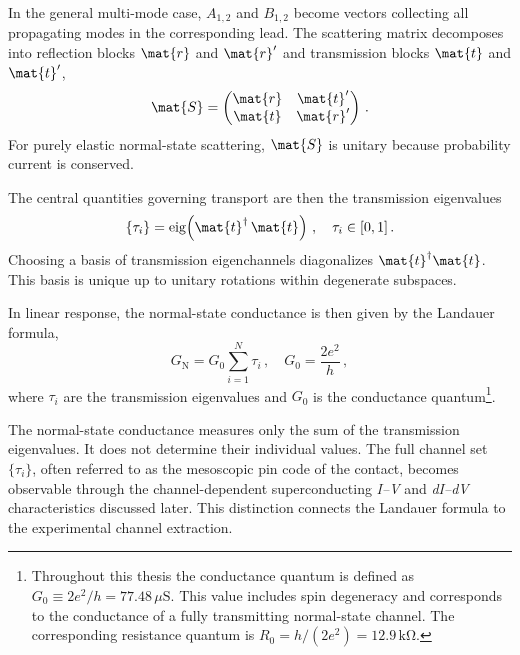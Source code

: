             In the general multi-mode case, $A_{1,2}$ and $B_{1,2}$ become vectors collecting all propagating modes in the corresponding lead. The scattering matrix decomposes into reflection blocks $\mat{r}$ and $\mat{r}'$ and transmission blocks $\mat{t}$ and $\mat{t}'$,
            \begin{equation}
                \mat{S}
                = \begin{pmatrix} \mat{r} & \mat{t}' \\ \mat{t} & \mat{r}' \end{pmatrix}\,.
                \label{eq:basics:scatter-2}
            \end{equation}
            For purely elastic normal-state scattering, $\mat{S}$ is unitary because probability current is conserved.
            
            The central quantities governing transport are then the transmission eigenvalues
            \begin{equation}
                \{\tau_i\} = \operatorname{eig}\!\left(\mat{t}^\dagger\,\mat{t}\right)\,,\quad 
                \tau_i\in[0,1]\,.
                \label{eq:basics:tau_i}
            \end{equation}
            Choosing a basis of transmission eigenchannels diagonalizes $\mat{t}^\dagger\mat{t}$. This basis is unique up to unitary rotations within degenerate subspaces.

            In linear response, the normal-state conductance is then given by the Landauer formula,
            \begin{equation}
                G_\mathrm{N} = G_0 \sum_{i=1}^N \tau_i\,,
                \quad
                G_0 = \frac{2e^2}{h}\,,
                \label{eq:basics:landauer}
            \end{equation}
            where $\tau_i$ are the transmission eigenvalues and $G_0$ is the conductance quantum\footnote{
                Throughout this thesis the conductance quantum is defined as $G_0 \equiv 2e^2/h = 77.48\,\mu\mathrm{S}$. This value includes spin degeneracy and corresponds to the conductance of a fully transmitting normal-state channel. The corresponding resistance quantum is $R_0 = h/(2e^2) = 12.9\,\mathrm{k\Omega}$.
            }.

            The normal-state conductance measures only the sum of the transmission eigenvalues. It does not determine their individual values. The full channel set $\{\tau_i\}$, often referred to as the mesoscopic pin code of the contact, becomes observable through the channel-dependent superconducting \textit{I--V} and \textit{dI--dV} characteristics discussed later. This distinction connects the Landauer formula to the experimental channel extraction. \cite{landauer_electrical_1970,buttiker_four-terminal_1986, beenakker_random-matrix_1997}

